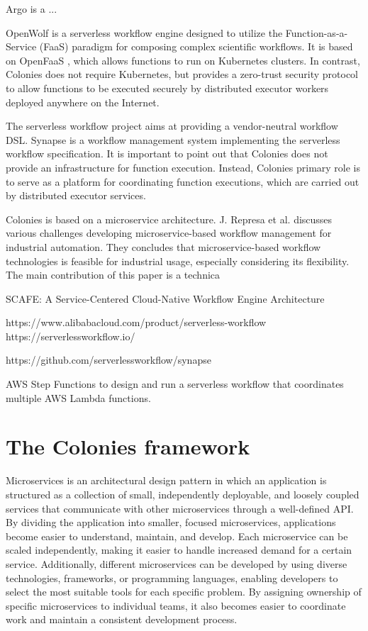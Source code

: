 \documentclass{article}
\begin{document}
Argo is a ...

OpenWolf \cite{openwolf} is a serverless workflow engine designed to utilize the Function-as-a-Service (FaaS) paradigm for composing complex scientific workflows. It is based on OpenFaaS \cite{openfaas}, which allows functions to run on Kubernetes clusters. In contrast, Colonies does not require Kubernetes, but provides a zero-trust security protocol to allow functions to be executed securely by distributed executor workers deployed anywhere on the Internet.

The serverless workflow project \cite{serverlessworkflow} aims at providing a vendor-neutral workflow DSL. Synapse is a workflow management system implementing the serverless workflow specification. It is important to point out that Colonies does not provide an infrastructure for function execution. Instead, Colonies primary role is to serve as a platform for coordinating function executions, which are carried out by distributed executor services.

Colonies is based on a microservice architecture. J. Represa et al. \cite{GarciaRepresa1740746} discusses various challenges developing microservice-based workflow management for industrial automation. They concludes that microservice-based workflow technologies is feasible for industrial usage, especially considering its flexibility. The main contribution of this paper is a technica 

SCAFE: A Service-Centered Cloud-Native Workflow Engine Architecture

https://www.alibabacloud.com/product/serverless-workflow
https://serverlessworkflow.io/

https://github.com/serverlessworkflow/synapse

AWS Step Functions to design and run a serverless workflow that coordinates multiple AWS Lambda functions.

\section{The Colonies framework}
\label{sec:headings}
Microservices is an architectural design pattern in which an application is structured as a collection of small, independently deployable, and loosely coupled services that communicate with other microservices through a well-defined API. By dividing the application into smaller, focused microservices, applications become easier to understand, maintain, and develop. Each microservice can be scaled independently, making it easier to handle increased demand for a certain service. Additionally, different microservices can be developed by using diverse technologies, frameworks, or programming languages, enabling developers to select the most suitable tools for each specific problem. By assigning ownership of specific microservices to individual teams, it also becomes easier to coordinate work and maintain a consistent development process.
\end{document}
